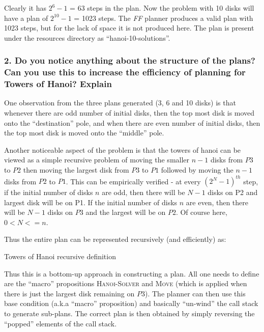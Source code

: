 \documentclass[10pt, letter]{article}
\begin{document}
Clearly it has $2^6 - 1$ = 63 steps in the plan. Now the problem with 10 disks will have a plan of $2^{10} - 1$ = 1023 steps. The \textit{FF} planner produces a valid plan with 1023 steps, but for the lack of space it is not produced here. The plan is present under the resources directory as ``hanoi-10-solutions''.

\subsubsection*{2. Do you notice anything about the structure of the plans? Can you use this to increase the
efficiency of planning for Towers of Hanoi? Explain}
One observation from the three plans generated (3, 6 and 10 disks) is that whenever there are odd number of initial disks, then the top most disk is moved onto the ``destination'' pole, and when there are even number of initial disks, then the top most disk is moved onto the ``middle'' pole.

Another noticeable aspect of the problem is that the towers of hanoi can be viewed as a simple recursive problem of moving the smaller $n-1$ disks from $P3$ to $P2$ then moving the largest disk from $P3$ to $P1$ followed by moving the $n-1$ disks from $P2$ to $P1$. This can be empirically verified - at every $(2^N - 1)^{th}$ step, if the initial number of disks $n$ are odd, then there will be $N-1$ disks on P2 and largest disk will be on P1. If the initial number of disks $n$ are even, then there will be $N-1$ disks on $P3$ and the largest will be on $P2$. Of course here, $0<N<=n$.

Thus the entire plan can be represented recursively (and efficiently) as: 
\begin{algorithm}
  \caption{Towers of Hanoi recursive definition}
  \begin{algorithmic}[1]
		\State {}
		\State {} 
	  	\State {}
    \EndFunction
  \end{algorithmic}
\end{algorithm}

Thus this is a bottom-up approach in constructing a plan. All one needs to define are the ``macro'' propositions \textsc{Hanoi-Solver} and \textsc{Move} (which is applied when there is just the largest disk remaining on $P3$). The planner can then use this base condition (a.k.a ``macro'' proposition) and basically ``un-wind'' the call stack to generate sub-plans. The correct plan is then obtained by simply reversing the ``popped'' elements of the call stack.
\end{document}
